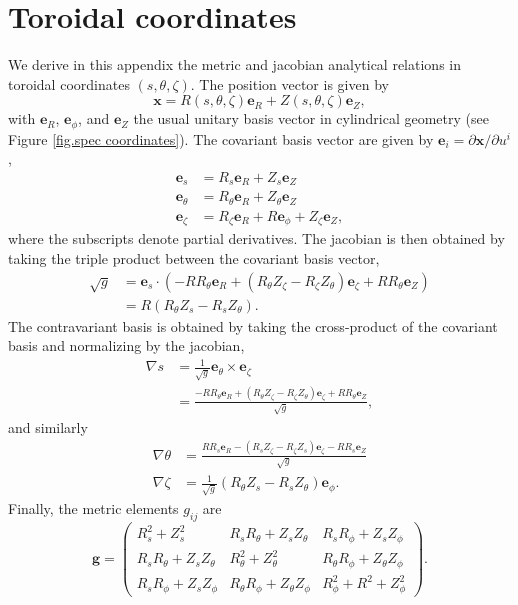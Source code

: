 \chapter{Toroidal coordinates} \label{app. toroidal coordinates}
We derive in this appendix the metric and jacobian analytical relations in toroidal coordinates $(s,\theta,\zeta)$. The position vector is given by
\begin{equation}
	\mathbf{x}=R(s,\theta,\zeta)\mathbf{e}_R+Z(s,\theta,\zeta)\mathbf{e}_Z,
\end{equation}
with $\mathbf{e}_R$, $\mathbf{e}_\phi$, and $\mathbf{e}_Z$ the usual unitary basis vector in cylindrical geometry (see Figure \ref{fig.spec coordinates}). The covariant basis vector are given by $\mathbf{e}_i=\partial\mathbf{x}/\partial u^i$, 
\begin{align}
	\mathbf{e}_s &= R_s\mathbf{e}_R+Z_s\mathbf{e}_Z\\
	\mathbf{e}_\theta &= R_\theta\mathbf{e}_R+Z_\theta\mathbf{e}_Z\\
	\mathbf{e}_\zeta &= R_\zeta\mathbf{e}_R+R\mathbf{e}_\phi +Z_\zeta\mathbf{e}_Z,
\end{align}
where the subscripts denote partial derivatives. The jacobian is then obtained by taking the triple product between the covariant basis vector, 
\begin{align}
	\sqrt{g}&=\mathbf{e}_s\cdot (-RR_\theta\mathbf{e}_R + (R_\theta Z_\zeta-R_\zeta Z_\theta)\mathbf{e}_\zeta + RR_\theta\mathbf{e}_Z)\\
	&= R(R_\theta Z_s - R_s Z_\theta).
\end{align}
The contravariant basis is obtained by taking the cross-product of the covariant basis and normalizing by the jacobian,
\begin{align}
	\nabla s &= \frac{1}{\sqrt{g}} \mathbf{e}_\theta\times\mathbf{e}_\zeta \\
	&= \frac{-RR_\theta\mathbf{e}_R + (R_\theta Z_\zeta-R_\zeta Z_\theta)\mathbf{e}_\zeta + RR_\theta\mathbf{e}_Z}{\sqrt{g}},
\end{align}
and similarly
\begin{align}
	\nabla\theta &= \frac{RR_s\mathbf{e}_R - (R_s Z_\zeta-R_\zeta Z_s)\mathbf{e}_\zeta - RR_s\mathbf{e}_Z}{\sqrt{g}}\\
	\nabla\zeta &= \frac{1}{\sqrt{g}}(R_\theta Z_s-R_s Z_\theta)\mathbf{e}_\phi.
\end{align}
Finally, the metric elements $g_{ij}$ are
\begin{equation}
	\mathbf{g}=\begin{pmatrix}
		R_s^2 + Z_s^2 & R_s R_\theta + Z_s Z_\theta &  R_s R_\phi + Z_s Z_\phi\\
		R_s R_\theta + Z_s Z_\theta & R_\theta^2 + Z_\theta^2 &  R_\theta R_\phi + Z_\theta Z_\phi\\
		R_s R_\phi + Z_s Z_\phi & R_\theta R_\phi + Z_\theta Z_\phi & R_\phi^2 + R^2 + Z_\phi^2
	\end{pmatrix}.
\end{equation}



